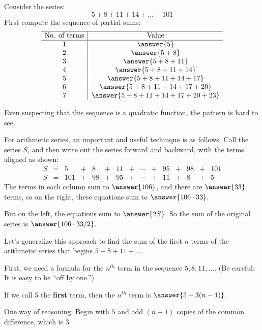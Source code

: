 \documentclass[nooutcomes]{ximera}
\begin{document}
\begin{problem}
Consider the series: 
\[
5+8+11+14+\dots+101
\]
First compute the sequence of partial sums: 
\[
\begin{array}{c|c} \hline
\text{No. of terms} & \text{Value} \\ \hline
1 & \answer{5} \\
2 & \answer{5+8} \\
3 & \answer{5+8+11}\\
4 & \answer{5+8+11+14}\\
5 & \answer{5+8+11+14+17}\\
6 & \answer{5+8+11+14+17+20}\\
7 & \answer{5+8+11+14+17+20+23}\\
\end{array}
\]

\begin{problem}
Even suspecting that this sequence is a quadratic function, the pattern is hard to see.  

For arithmetic series, an important and useful technique is as follows. Call the series $S$, and then write out the series forward and backward, with the terms aligned as shown:  
\[
\begin{array}{ccccccccccccccc}
S & = &     5  & + & 8      & + &  11    & + & \cdots & + & 95 & + & 98 & + & 101 \\
S & = & 101 & + & 98 & + & 95 & + & \cdots & + & 11     & + &    8   & + & 5
\end{array}
\]
The terms in each column sum to $\answer{106}$, and there are $\answer{33}$ terms, so on the right, these equations sum to $\answer{106\cdot 33}$.  

But on the left, the equations sum to $\answer{2S}$.  So the sum of the original series is 
$\answer{106\cdot 33/2}$. 

\begin{problem}
Let's generalize this approach to find the sum of the first $n$ terms of the arithmetic series that begins $5+8+11+\dots$.  

First, we need a formula for the $n^{th}$ term in the sequence $5, 8, 11, \dots$.  (Be careful:  It is easy to be ``off by one.'')

If we call 5 the \textbf{first} term, then the $n^{th}$ term is $\answer{5+3(n-1)}$.  
\begin{feedback}
One way of reasoning:  Begin with $5$ and add $(n-1)$ copies of the common difference, which is $3$.  
\end{feedback}


\end{problem}
\end{problem}
\end{problem}
\end{document}
